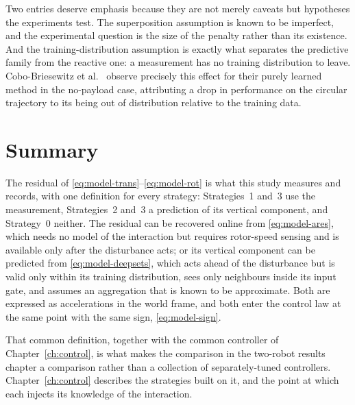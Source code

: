 Two entries deserve emphasis because they are not merely caveats but hypotheses the experiments
test. The superposition assumption is known to be imperfect, and the experimental question is the
size of the penalty rather than its existence. And the training-distribution assumption is exactly
what separates the predictive family from the reactive one: a measurement has no training
distribution to leave. Cobo-Briesewitz et al.~\cite{cobobriesewitz2026lindi} observe precisely this
effect for their purely learned method in the no-payload case, attributing a drop in performance on
the circular trajectory to its being out of distribution relative to the training data.

\section{Summary}
\label{sec:model-summary}

The residual of \eqref{eq:model-trans}--\eqref{eq:model-rot} is what this study measures and
records, with one definition for every strategy: Strategies~1 and~3 use the measurement,
Strategies~2 and~3 a prediction of its vertical component, and Strategy~0 neither. The residual can be recovered online from
\eqref{eq:model-ares}, which needs no model of the interaction but requires rotor-speed sensing and
is available only after the disturbance acts; or its vertical component can be predicted from
\eqref{eq:model-deepsets}, which acts ahead of the disturbance but is valid only within its training
distribution, sees only neighbours inside its input gate, and assumes an aggregation that is known
to be approximate. Both are expressed as accelerations in the world frame, and both enter the
control law at the same point with the same sign, \eqref{eq:model-sign}.

That common definition, together with the common controller of Chapter~\ref{ch:control}, is what
makes the comparison in the two-robot results chapter a comparison rather than a collection of
separately-tuned controllers. Chapter~\ref{ch:control}
describes the strategies built on it, and the point at which each injects its knowledge of
the interaction.
